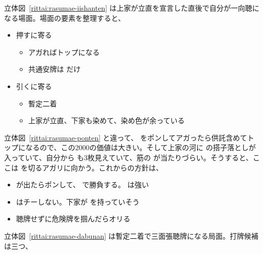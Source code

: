 \documentclass[../nankiru_main.tex]{subfiles}
\begin{document}
立体図~\ref{rittai:rasumae-iishanten} は上家が立直を宣言した直後で自分が一向聴になる場面。場面の要素を整理すると、

\begin{itemize}
  \item 押すに寄る
  \begin{itemize}
    \item アガればトップになる
    \item 共通安牌は  だけ
  \end{itemize}
  \item 引くに寄る
  \begin{itemize}
    \item 暫定二着
    \item 上家が立直、下家も染めて、染め色が余っている
  \end{itemize}
\end{itemize}

立体図~\ref{rittai:rasumae-ponten} と違って、 をポンしてアガったら供託含めてトップになるので、この2000の価値は大きい。そして上家の河に  の搭子落としが入っていて、自分から  も3枚見えていて、筋の  が当たりづらい。そうすると、ここは  を切るアガリに向かう\citep[][pp.~186--189]{doi}。これからの方針は、

\begin{itemize}
\item {} が出たらポンして、 で勝負する。 は強い
\item {} はチーしない。下家が  を持っていそう
\item 聴牌せずに危険牌を掴んだらオリる
\end{itemize}

\begin{rittai}[hbt]
  \centering
  \caption{}
  \label{rittai:rasumae-iishanten}
\end{rittai}

立体図~\ref{rittai:rasumae-dabunan} は暫定二着で三面張聴牌になる局面。打牌候補は三つ、
\end{document}
